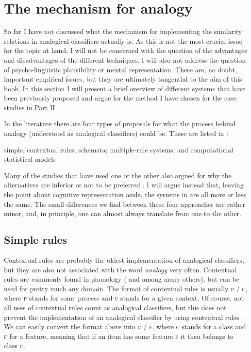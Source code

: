 \section{The mechanism for analogy}\label{sec:mechanisms-analogy}

\largerpage
So far I have not discussed what the mechanism for implementing the similarity relations in analogical classifiers actually is. As this is not the most crucial issue for the topic at hand, I will not be concerned with the question of the advantages and disadvantages of the different techniques. I will also not address the question of psycho-linguistic plausibility or mental representation. These are, no doubt, important empirical issues, but they are ultimately tangential to the aim of this book. In this section I will present a brief overview of different systems that have been previously proposed and argue for the method I have chosen for the case studies in Part II.

In the literature there are four types of proposals for what the process behind analogy (understood as analogical classifiers) could be. These are listed in :

\begin{exe}
    \ex \label{analogy-types}
    \begin{xlist}
        \ex simple, contextual rules;
        \ex schemata;
        \ex multiple-rule systems; and
        \ex computational statistical models%
    \end{xlist}
\end{exe}

Many of the studies that have used one or the other also argued for why the alternatives are inferior or not to be preferred \autocite{Albright.2003, Yaden.2003, Eddington.2000, Gouskova.2015}. I will argue instead that, leaving the point about cognitive representation aside, the systems in  are all more or less the same. The small differences we find between these four approaches are rather minor, and, in principle, one can almost always translate from one to the other.

\subsection{Simple rules}

Contextual rules are probably the oldest implementation of analogical classifiers, but they are also not associated with the word \textit{analogy} very often. Contextual rules are commonly found in phonology (\citealt{Chomsky.1968} and \citealt{Goldsmith.2011} among many others), but can be used for pretty much any domain. The format of contextual rules is usually \textsc{p / c}, where \textsc{p} stands for some process and \textsc{c} stands for a given context. Of course, not all uses of contextual rules count as analogical classifiers, but this does not prevent the implementation of an analogical classifier by using contextual rules. We can easily convert the format above into \textsc{c / f}, where \textsc{c} stands for a class and  \textsc{f} for a feature, meaning that if an item has some feature \textsc{f} it then belongs to class \textsc{c}.

